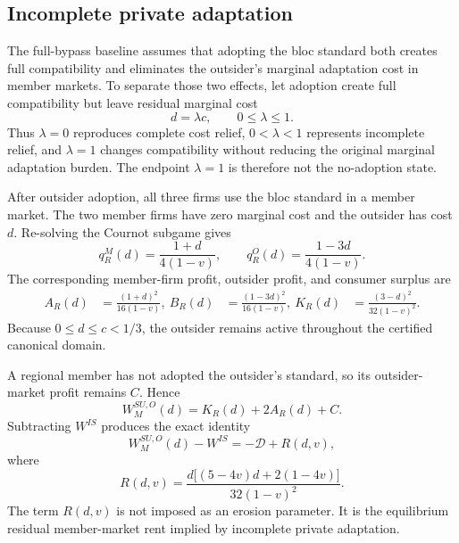\subsection{Incomplete private adaptation}
\label{subsec:partial-adaptation}

The full-bypass baseline assumes that adopting the bloc standard both creates full compatibility and eliminates the outsider's marginal adaptation cost in member markets. To separate those two effects, let adoption create full compatibility but leave residual marginal cost
\begin{equation}
    d=\lambda c,
    \qquad
    0\leq\lambda\leq1.
    \label{eq:residual-cost-definition}
\end{equation}
Thus $\lambda=0$ reproduces complete cost relief, $0<\lambda<1$ represents incomplete relief, and $\lambda=1$ changes compatibility without reducing the original marginal adaptation burden. The endpoint $\lambda=1$ is therefore not the no-adoption state.

After outsider adoption, all three firms use the bloc standard in a member market. The two member firms have zero marginal cost and the outsider has cost $d$. Re-solving the Cournot subgame gives
\begin{equation}
    q_R^M(d)=\frac{1+d}{4(1-v)},
    \qquad
    q_R^O(d)=\frac{1-3d}{4(1-v)}.
    \label{eq:partial-erosion-quantities}
\end{equation}
The corresponding member-firm profit, outsider profit, and consumer surplus are
\begin{align}
    A_R(d)&=\frac{(1+d)^2}{16(1-v)},\
    B_R(d)&=\frac{(1-3d)^2}{16(1-v)},\
    K_R(d)&=\frac{(3-d)^2}{32(1-v)^2}.
    \label{eq:partial-erosion-blocks}
\end{align}
Because $0\leq d\leq c<1/3$, the outsider remains active throughout the certified canonical domain.

A regional member has not adopted the outsider's standard, so its outsider-market profit remains $C$. Hence
\begin{equation}
    W_M^{SU,O}(d)
    =
    K_R(d)+2A_R(d)+C.
    \label{eq:partial-erosion-welfare}
\end{equation}
Subtracting $W^{IS}$ produces the exact identity
\begin{equation}
    \boxed{
    W_M^{SU,O}(d)-W^{IS}
    =
    -\mathscr D+R(d,v),
    }
    \label{eq:partial-erosion-identity}
\end{equation}
where
\begin{equation}
    \boxed{
    R(d,v)
    =
    \frac{d\bigl[(5-4v)d+2(1-4v)\bigr]}
         {32(1-v)^2}.
    }
    \label{eq:residual-rent}
\end{equation}
The term $R(d,v)$ is not imposed as an erosion parameter. It is the equilibrium residual member-market rent implied by incomplete private adaptation.

